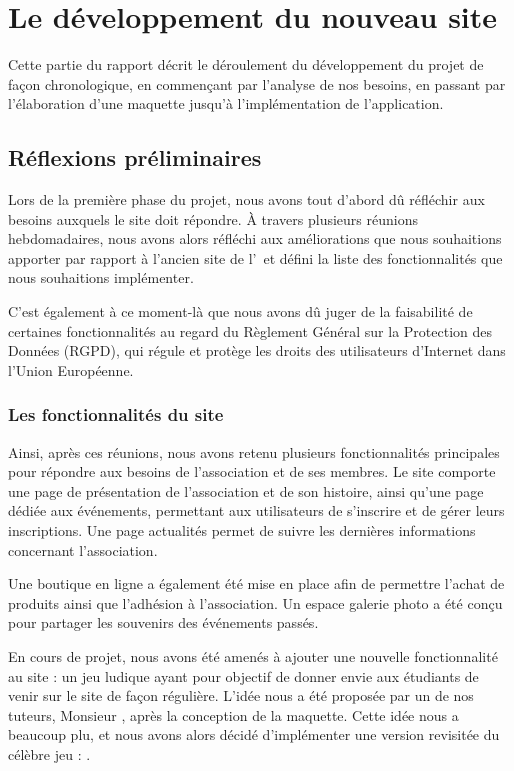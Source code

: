 \chapter{Le développement du nouveau site}

Cette partie du rapport décrit le déroulement du développement du projet de façon chronologique, en commençant par l'analyse de nos besoins, en passant par l'élaboration d'une maquette jusqu'à l'implémentation de l'application.

\section{Réflexions préliminaires}

Lors de la première phase du projet, nous avons tout d'abord dû réfléchir aux besoins auxquels le site doit répondre.  
À travers plusieurs réunions hebdomadaires, nous avons alors réfléchi aux améliorations que nous souhaitions apporter par rapport à l’ancien site de l’\ofni\ et défini la liste des fonctionnalités que nous souhaitions implémenter.  

C'est également à ce moment-là que nous avons dû juger de la faisabilité de certaines fonctionnalités au regard du Règlement Général sur la Protection des Données (RGPD), qui régule et protège les droits des utilisateurs d'Internet dans l'Union Européenne.

\subsection{Les fonctionnalités du site}

Ainsi, après ces réunions, nous avons retenu plusieurs fonctionnalités principales pour répondre aux besoins de l'association et de ses membres. Le site comporte une page de présentation de l’association et de son histoire, ainsi qu’une page dédiée aux événements, permettant aux utilisateurs de s’inscrire et de gérer leurs inscriptions. Une page actualités permet de suivre les dernières informations concernant l’association.  

Une boutique en ligne a également été mise en place afin de permettre l’achat de produits ainsi que l’adhésion à l’association. Un espace galerie photo a été conçu pour partager les souvenirs des événements passés.  

En cours de projet, nous avons été amenés à ajouter une nouvelle fonctionnalité au site : un jeu ludique ayant pour objectif de donner envie aux étudiants de venir sur le site de façon régulière. L'idée nous a été proposée par un de nos tuteurs, Monsieur , après la conception de la maquette. Cette idée nous a beaucoup plu, et nous avons alors décidé d'implémenter une version revisitée du célèbre jeu : \game.
\pagebreak

